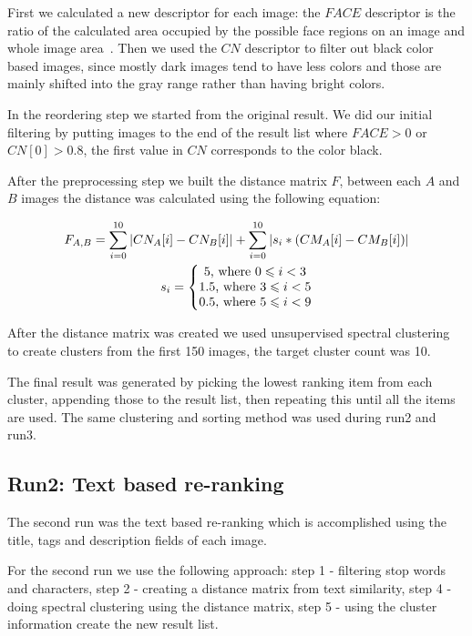 \documentclass{acm_proc_article-me}
\begin{document}

First we calculated a new descriptor for each image: the $FACE$ descriptor is the ratio of the calculated area occupied by the possible face regions on an image and whole
image area~\cite{szHucs2013bmemtm}. Then we used the $CN$ descriptor to filter out black color based images, since mostly dark images tend to have less colors and those are mainly shifted into the gray range rather than having bright colors.

In the reordering step we started from the original result. We did our initial filtering by putting images to the end of the result list where $FACE>0$ or $CN[0]>0.8$, the first value in $CN$ corresponds to the color black.

After the preprocessing step we built the distance matrix $F$, between each $A$ and $B$ images the distance was calculated using the following equation:

\begin{gather*} 
F_{A,B} = \sum_{i=0}^{10}  \left | CN_{A}[i]-CN_{B}[i] \right | +\sum_{i=0}^{10} \left | s_i * (CM_{A}[i]-CM_{B}[i]) \right |\\
s_i = \left\{\begin{matrix}
5 \textup{, where }0 \leqslant  i < 3\\ 
1.5 \textup{, where }3 \leqslant  i < 5\\ 
0.5 \textup{, where }5 \leqslant  i < 9
\end{matrix}\right.
\end{gather*}

After the distance matrix was created we used unsupervised spectral clustering~\cite{Ma2009,Ng01onspectral} to create clusters from the first 150 images, the target cluster count was 10. 

The final result was generated by picking the lowest ranking item from each cluster, appending those to the result list, then repeating this until all the items are used. The same clustering and sorting method was used during run2 and run3.

\subsection{Run2: Text based re-ranking}\label{run2}
The second run was the text based re-ranking which is accomplished using the title, tags and description fields of each image.

For the second run we use the following approach: step 1 - filtering stop words and characters, step 2 - creating a distance matrix from text similarity, step 4 - doing spectral clustering using the distance matrix, step 5 - using the cluster information create the new result list.
\end{document}
